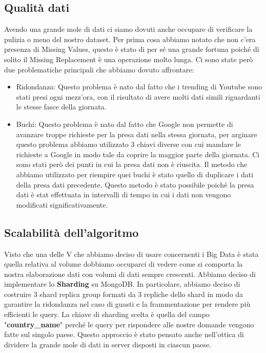 \documentclass[10pt, a4paper,openany]{article}
\begin{document}
\subsection*{Qualità dati}
Avendo una grande mole di dati ci siamo dovuti anche occupare di verificare la pulizia o meno del nostro dataset. Per prima cosa abbiamo notato che non c'era presenza di Missing Values, questo è stato di per sé una grande fortuna poiché di solito il Missing Replacement è una operazione molto lunga.  Ci sono state però due problematiche principali che abbiamo dovuto affrontare:
\begin{itemize}
	\item Ridondanza: Questo problema è nato dal fatto che i trending di Youtube sono stati presi ogni mezz'ora, con il risultato di avere molti dati simili riguardanti le stesse fasce della giornata. 
	\item Buchi: Questo problema è nato dal fatto che Google non permette di avanzare troppe richieste per la presa dati nella stessa giornata, per arginare questo problema abbiamo utilizzato 3 chiavi diverse con cui mandare le richieste a Google in modo tale da coprire la maggior parte della giornata. Ci sono stati però dei punti in cui la presa dati non è riuscita. Il metodo che abbiamo utilizzato per riempire quei buchi è stato quello di duplicare i dati della presa dati precedente. Questo metodo è stato possibile poiché la presa dati è stat effettuata in intervalli di tempo in cui i dati non vengono modificati significativamente.
	
\end{itemize}

\subsection*{Scalabilità dell'algoritmo}

Visto che una delle V che abbiamo deciso di usare concernenti i Big Data è stata quella relativa al volume dobbiamo occuparci di vedere come si comporta la nostra elaborazione dati con volumi di dati sempre crescenti. Abbiamo deciso di implementare lo \textbf{Sharding} su MongoDB. In particolare, abbiamo deciso di costruire 3 shard replica group formati da 3 repliche dello shard in modo da garantire la ridondanza nel caso di guasti e la frammentazione per rendere più efficienti le query. La chiave di sharding scelta è quella del campo "\textbf{country\_name}" perché le query per rispondere alle nostre domande vengono fatte sul singolo paese. Questo approccio è stato pensato anche nell'ottica di dividere la grande mole di dati in server disposti in ciascun paese. 
\end{document}
